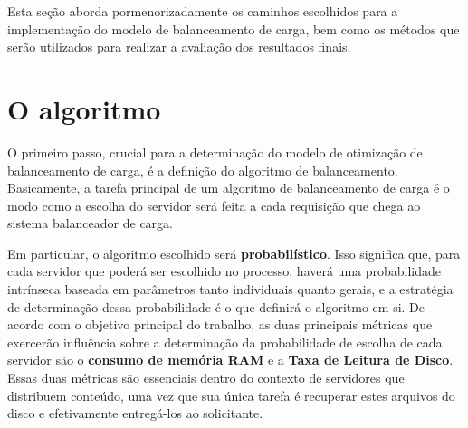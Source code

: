



Esta seção aborda pormenorizadamente os caminhos escolhidos para a implementação do modelo de balanceamento de carga, bem como os métodos que serão utilizados para realizar a avaliação dos resultados finais.

\section{O algoritmo}

O primeiro passo, crucial para a determinação do modelo de otimização de balanceamento de carga, é a definição do algoritmo de balanceamento. Basicamente, a tarefa principal de um algoritmo de balanceamento de carga é o modo como a escolha do servidor será feita a cada requisição que chega ao sistema balanceador de carga.

Em particular, o algoritmo escolhido será \textbf{probabilístico}. Isso significa que, para cada servidor que poderá ser escolhido no processo, haverá uma probabilidade intrínseca baseada em parâmetros tanto individuais quanto gerais, e a estratégia de determinação dessa probabilidade é o que definirá o algoritmo em si. De acordo com o objetivo principal do trabalho, as duas principais métricas que exercerão influência sobre a determinação da probabilidade de escolha de cada servidor são o \textbf{consumo de memória RAM} e a \textbf{Taxa de Leitura de Disco}. Essas duas métricas são essenciais dentro do contexto de servidores que distribuem conteúdo, uma vez que sua única tarefa é recuperar estes arquivos do disco e efetivamente entregá-los ao solicitante. 

